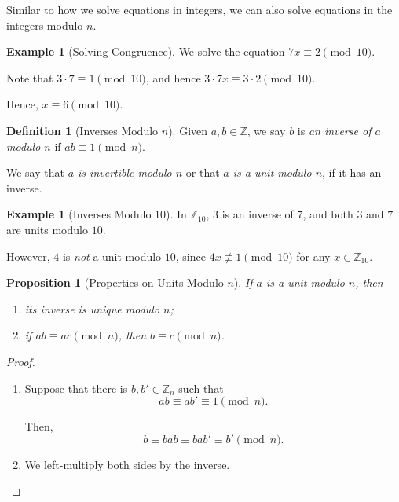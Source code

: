 \documentclass{article}
\newtheorem{proposition}[theorem]{Proposition}
\theoremstyle{definition}
\newtheorem{definition}[theorem]{Definition}
\newtheorem{example}[theorem]{Example}
\theoremstyle{remark}
\newcommand{\nequiv}{\not\equiv}
\newcommand{\ZZ}{\mathbb{Z}}
\begin{document}
Similar to how we solve equations in integers, we can also solve equations in the integers modulo \(n\).

\begin{example}[Solving Congruence]
    We solve the equation \(7x \equiv 2 \pmod{10}\).

    Note that \(3 \cdot 7 \equiv 1 \pmod{10}\), and hence \(3 \cdot 7x \equiv 3 \cdot 2 \pmod{10}\).

    Hence, \(x \equiv 6 \pmod{10}\).
\end{example}

\begin{definition}[Inverses Modulo \(n\)]
    Given \(a, b \in \ZZ\), we say \(b\) is \emph{an inverse of \(a\) modulo \(n\)} if \(ab \equiv 1 \pmod{n}\).

    We say that \emph{\(a\) is invertible modulo \(n\)} or that \emph{\(a\) is a unit modulo \(n\)}, if it has an inverse.
\end{definition}

\begin{example}[Inverses Modulo \(10\)]
    In \(\ZZ_{10}\), \(3\) is an inverse of \(7\), and both \(3\) and \(7\) are units modulo \(10\).

    However, \(4\) is \emph{not} a unit modulo \(10\), since \(4x \nequiv 1 \pmod{10}\) for any \(x \in \ZZ_{10}\).
\end{example}

\begin{proposition}[Properties on Units Modulo \(n\)]
    If \(a\) is a unit modulo \(n\), then
    \begin{enumerate}
        \item its inverse is unique modulo \(n\);
        \item if \(ab \equiv ac \pmod{n}\), then \(b \equiv c \pmod{n}\).
    \end{enumerate}
\end{proposition}

\begin{proof}
    \begin{enumerate}
        \item Suppose that there is \(b, b' \in \ZZ_n\) such that
        \[
            ab \equiv ab' \equiv 1 \pmod{n}.
        \]

        Then,
        \[
            b \equiv bab \equiv bab' \equiv b' \pmod{n}.
        \]

        \item We left-multiply both sides by the inverse.
    \end{enumerate}
\end{proof}
\end{document}
